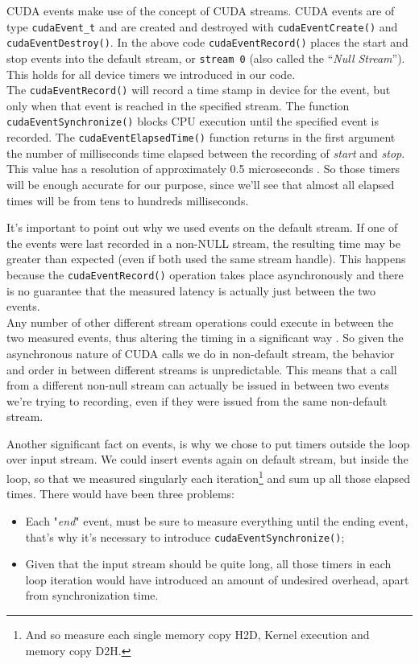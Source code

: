 CUDA events make use of the concept of CUDA streams. 
CUDA events are of type \texttt{cudaEvent\_t} and are created and destroyed with \texttt{cudaEventCreate()} and \texttt{cudaEventDestroy()}. In the above code \texttt{cudaEventRecord()} places the start and stop events into the default stream, or \texttt{stream 0} (also called the “\textit{Null Stream}”). This holds for all device timers we introduced in our code.\\
The \texttt{cudaEventRecord()} will record a time stamp in device for the event, but only when that event is reached in the specified stream. The function \texttt{cudaEventSynchronize()} blocks CPU execution until the specified event is recorded. The \texttt{cudaEventElapsedTime()} function returns in the first argument the number of milliseconds time elapsed between the recording of \textit{start} and \textit{stop}. This value has a resolution of approximately 0.5 microseconds \cite{devblogevents}. So those timers will be enough accurate for our purpose, since we'll see that almost all elapsed times will be from tens to hundreds milliseconds.

It's important to point out why we used events on the default stream. 
If one of the events were last recorded in a non-NULL stream, the resulting time may be greater than expected (even if both used the same stream handle). This happens because the \texttt{cudaEventRecord()} operation takes place asynchronously and there is no guarantee that the measured latency is actually just between the two events.\\
Any number of other different stream operations could execute in between the two measured events, thus altering the timing in a significant way \cite{libevents}.
So given the asynchronous nature of CUDA calls we do in non-default stream, the behavior and order in between different streams is unpredictable. This means that a call from a different non-null stream can actually be issued in between two events we're trying to recording, even if they were issued from the same non-default stream.

Another significant fact on events, is why we chose to put timers outside the loop over input stream.
We could insert events again on default stream, but inside the loop, so that we measured singularly each iteration\footnote{And so measure each single memory copy H2D, Kernel execution and memory copy D2H.} and sum up all those elapsed times.
There would have been three problems:
\begin{itemize}
	\item Each "\textit{end}" event, must be sure to measure everything until the ending event, that's why it's necessary to introduce \texttt{cudaEventSynchronize()};
	\item Given that the input stream should be quite long, all those timers in each loop iteration would have introduced an amount of undesired overhead, apart from synchronization time.
\end{itemize}

